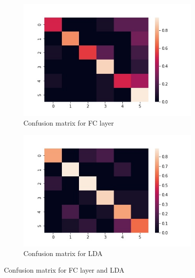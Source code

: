 \documentclass[11pt]{article}
\begin{document}
	
\begin{figure}[h!]
  \centering
  \begin{subfigure}[b]{0.4\linewidth}
    \includegraphics[width=\linewidth]{fedStanford601lr005_2x3others.jpg}
    \caption{Confusion matrix for FC layer}
  \end{subfigure}
  \begin{subfigure}[b]{0.4\linewidth}
    \includegraphics[width=\linewidth]{fedStanford601LDA.jpg}
    \caption{Confusion matrix for LDA}
  \end{subfigure}
  \caption{Confusion matrix for FC layer and LDA}
  \label{fig:6FCLDA}
\end{figure}
\end{document}
